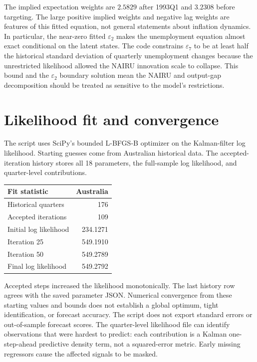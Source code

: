 \documentclass[11pt,a4paper]{article}
\newcommand{\eps}{\varepsilon}
\begin{document}
The implied expectation weights are $2.5829$ after 1993Q1 and $3.2308$
before targeting. The large positive implied weights and negative lag weights
are features of this fitted equation, not general statements about inflation
dynamics. In particular, the near-zero fitted $\eps_2$ makes the unemployment
equation almost exact conditional on the latent states. The code constrains
$\eps_7$ to be at least half the historical standard deviation of quarterly
unemployment changes because the unrestricted likelihood allowed the NAIRU
innovation scale to collapse. This bound and the $\eps_2$ boundary solution
mean the NAIRU and output-gap decomposition should be treated as sensitive to
the model's restrictions.

\section{Likelihood fit and convergence}
The script uses SciPy's bounded L-BFGS-B optimizer on the Kalman-filter log
likelihood. Starting guesses come from Australian historical data. The
accepted-iteration history stores all 18 parameters, the full-sample log
likelihood, and quarter-level contributions.

\begin{center}
\begin{tabular}{@{}lr@{}}
\toprule
Fit statistic & Australia\\
\midrule
Historical quarters & 176\\
Accepted iterations & 109\\
Initial log likelihood & 234.1271\\
Iteration 25 & 549.1910\\
Iteration 50 & 549.2789\\
Final log likelihood & 549.2792\\
\bottomrule
\end{tabular}
\end{center}

Accepted steps increased the likelihood monotonically. The last history row
agrees with the saved parameter JSON. Numerical convergence from these
starting values and bounds does not establish a global optimum, tight
identification, or forecast accuracy. The script does not export standard
errors or out-of-sample forecast scores. The quarter-level likelihood file
can identify observations that were hardest to predict: each contribution is
a Kalman one-step-ahead predictive density term, not a squared-error metric.
Early missing regressors cause the affected signals to be masked.
\end{document}
